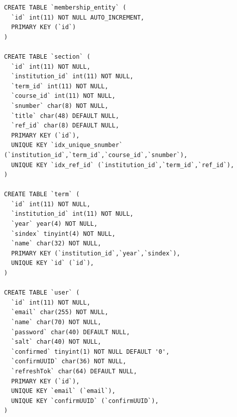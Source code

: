 \documentclass{article}
\begin{document}
\begin{verbatim}
CREATE TABLE `membership_entity` (
  `id` int(11) NOT NULL AUTO_INCREMENT,
  PRIMARY KEY (`id`)
)

CREATE TABLE `section` (
  `id` int(11) NOT NULL,
  `institution_id` int(11) NOT NULL,
  `term_id` int(11) NOT NULL,
  `course_id` int(11) NOT NULL,
  `snumber` char(8) NOT NULL,
  `title` char(48) DEFAULT NULL,
  `ref_id` char(8) DEFAULT NULL,
  PRIMARY KEY (`id`),
  UNIQUE KEY `idx_unique_snumber` (`institution_id`,`term_id`,`course_id`,`snumber`),
  UNIQUE KEY `idx_ref_id` (`institution_id`,`term_id`,`ref_id`),
)

CREATE TABLE `term` (
  `id` int(11) NOT NULL,
  `institution_id` int(11) NOT NULL,
  `year` year(4) NOT NULL,
  `sindex` tinyint(4) NOT NULL,
  `name` char(32) NOT NULL,
  PRIMARY KEY (`institution_id`,`year`,`sindex`),
  UNIQUE KEY `id` (`id`),
)

CREATE TABLE `user` (
  `id` int(11) NOT NULL,
  `email` char(255) NOT NULL,
  `name` char(70) NOT NULL,
  `password` char(40) DEFAULT NULL,
  `salt` char(40) NOT NULL,
  `confirmed` tinyint(1) NOT NULL DEFAULT '0',
  `confirmUUID` char(36) NOT NULL,
  `refreshTok` char(64) DEFAULT NULL,
  PRIMARY KEY (`id`),
  UNIQUE KEY `email` (`email`),
  UNIQUE KEY `confirmUUID` (`confirmUUID`),
)
\end{verbatim}
\end{document}
